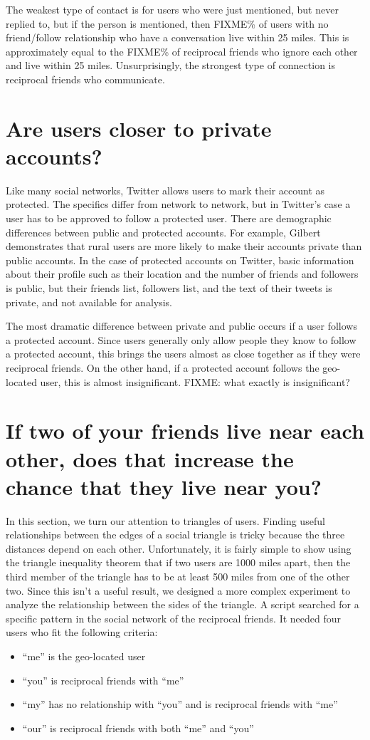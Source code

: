 The weakest type of contact is for users who were just mentioned, but never
replied to, but if the person is mentioned, then FIXME\% of users with no
friend/follow relationship who have a conversation live within 25 miles.
This is approximately equal to the FIXME\% of reciprocal friends who ignore each
other and live within 25 miles.
Unsurprisingly, the strongest type of connection is reciprocal friends who
communicate.


\section{Are users closer to private accounts?}

Like many social networks, Twitter allows users to mark their account as
protected. The specifics differ from network to network, but in Twitter's case
a user has to be approved to follow a protected user.
There are demographic differences between public and protected accounts.
For example, Gilbert \cite{gilbert2008network} demonstrates that rural users
are more likely to make their accounts private than public accounts.
In the case of protected accounts on Twitter, basic information
about their profile such as their location and the number of friends and
followers is public, but their friends list, followers list, and the text of
their tweets is private, and not available for analysis.

The most dramatic difference between private and public occurs if a user
follows a protected account.
Since users generally only allow people they know to follow a protected
account, this brings the users almost as close together as if they were
reciprocal friends.
On the other hand, if a protected account follows the geo-located user, this is
almost insignificant.
FIXME: what exactly is insignificant?

\section{If two of your friends live near each other, does that increase the
chance that they live near you?}
In this section, we turn our attention to triangles of users.
Finding useful relationships between the edges of a social triangle is tricky
because the three distances depend on each other.
Unfortunately, it is fairly simple to show using the triangle inequality theorem
that if two users are 1000 miles apart, then the third member of the triangle
has to be at least 500 miles from one of the other two.
Since this isn't a useful result, we designed a more complex experiment to
analyze the relationship between the sides of the triangle.
A script searched for a specific pattern in the social network of the
reciprocal friends.  It needed four users who fit the following criteria:
\begin{itemize}
\item ``me'' is the geo-located user
\item ``you'' is reciprocal friends with ``me''
\item ``my'' has no relationship with ``you'' and is reciprocal friends with ``me''
\item ``our'' is reciprocal friends with both ``me'' and ``you''
\end{itemize}

